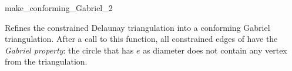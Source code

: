 \begin{ccRefFunction}{make_conforming_Gabriel_2}


{ Refines the constrained Delaunay triangulation  into a
  conforming Gabriel triangulation. After a call to this function, all
  constrained edges of  have the \emph{Gabriel property}: the
  circle that has $e$ as diameter does not contain any vertex from
  the triangulation.  
  }

\end{ccRefFunction}

